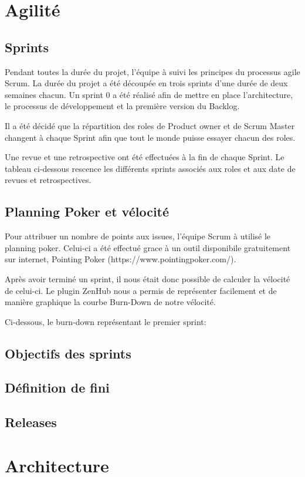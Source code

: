 \documentclass[12pt,a4paper,oneside]{book}
\begin{document}
	\chapter{Agilité}
	\section{Sprints}	
	Pendant toutes la durée du projet, l’équipe à suivi les principes du processus agile Scrum. La durée du projet a été découpée en trois sprints d’une durée de deux semaines chacun. Un sprint 0 a été réalisé afin de mettre en place l’architecture, le processus de développement et la première version du Backlog.
	
	Il a été décidé que la répartition des roles de Product owner et de Scrum Master changent à chaque Sprint afin que tout le monde puisse essayer chacun des roles.
	
	Une revue et une retrospective ont été effectuées à la fin de chaque Sprint.
	Le tableau ci-dessous rescence les différents sprints associés aux roles et aux date de revues et retrospectives.
	
	\section{Planning Poker et vélocité}
	Pour attribuer un nombre de points aux issues, l’équipe Scrum à utilisé le planning poker. Celui-ci a été effectué grace à un outil disponibile gratuitement sur internet, Pointing Poker (https://www.pointingpoker.com/).
	
	Après avoir terminé un sprint, il nous était donc possible de calculer la vélocité de celui-ci. Le plugin ZenHub nous a permis de représenter facilement et de manière graphique la courbe Burn-Down de notre vélocité. 
	
	Ci-dessous, le burn-down représentant le premier sprint:
	
	\section{Objectifs des sprints}
	\section{Définition de fini}
	\section{Releases}
	
	\chapter{Architecture}
\end{document}

